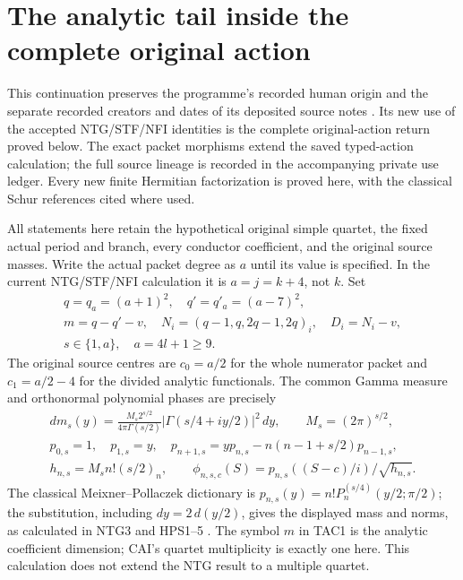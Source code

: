 \documentclass[11pt,a4paper]{article}
\begin{document}
\section{The analytic tail inside the complete original action}
\label{sec:TAC}

This continuation preserves the programme's recorded human origin and the
separate recorded creators and dates of its deposited source notes
\cite{human:globalization2026,human:splitzero2026}. Its new use of the
accepted NTG/STF/NFI identities is the complete original-action return
proved below. The exact packet morphisms extend the saved typed-action
calculation; the full source lineage is recorded in the accompanying
private use ledger. Every new finite Hermitian factorization is proved
here, with the classical Schur references cited where used.

All statements here retain the hypothetical original simple quartet,
the fixed actual period and branch, every conductor coefficient, and the
original source masses.  Write the actual packet degree as $a$ until its
value is specified.  In the current NTG/STF/NFI calculation it is
$a=j=k+4$, not $k$.  Set
\[
\begin{gathered}
 q=q_a=(a+1)^2,\quad q'=q'_a=(a-7)^2,\\
 m=q-q'-v,\quad N_i=(q-1,q,2q-1,2q)_i,\quad D_i=N_i-v,
 \\ s\in\{1,a\},\quad a=4l+1\ge9.
 \tag{TAC1}
\end{gathered}
\]
The original source centres are $c_0=a/2$ for the whole numerator
packet and $c_1=a/2-4$ for the divided analytic functionals.  The common
Gamma measure and orthonormal polynomial phases are precisely
\[
\begin{gathered}
 dm_s(y)=\frac{M_s2^{s/2}}{4\pi\Gamma(s/2)}
       |\Gamma(s/4+iy/2)|^2\,dy,\qquad M_s=(2\pi)^{s/2},\\
 p_{0,s}=1,\quad p_{1,s}=y,\quad
 p_{n+1,s}=yp_{n,s}-n(n-1+s/2)p_{n-1,s},\\
 h_{n,s}=M_sn!(s/2)_n,\qquad
 \phi_{n,s,c}(S)=p_{n,s}((S-c)/i)/\sqrt{h_{n,s}}.
\end{gathered}\tag{TAC1a}
\]
The classical Meixner--Pollaczek dictionary is
$p_{n,s}(y)=n!P_n^{(s/4)}(y/2;\pi/2)$; the substitution, including
$dy=2\,d(y/2)$, gives the displayed mass and norms, as calculated
in NTG3 and HPS1--5
\cite[eqs.~(18.19.8)--(18.19.9), (18.22.8)]{human:dlmf18}.  The symbol $m$ in TAC1 is the analytic
coefficient dimension; CAI's quartet multiplicity is exactly one here.
This calculation does not extend the NTG result to a multiple quartet.
\end{document}
